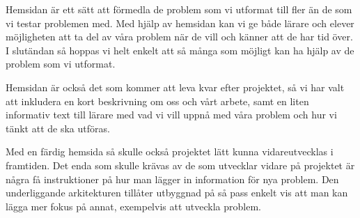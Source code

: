 \textcolor{Mahogany}{Hemsidan är ett sätt att förmedla de problem som vi utformat till fler än de som vi testar problemen med. Med hjälp av hemsidan kan vi ge både lärare och elever möjligheten att ta del av våra problem när de vill och känner att de har tid över.
I slutändan så hoppas vi helt enkelt att så många som möjligt kan ha hjälp av de problem som vi utformat.}

\textcolor{Mahogany}{Hemsidan är också det som kommer att leva kvar efter projektet, så vi har valt att inkludera en kort beskrivning om oss och vårt arbete, samt en liten informativ text till lärare med vad vi vill uppnå med våra problem och hur vi tänkt att de ska utföras.}

\textcolor{WildStrawberry}{
    Med en färdig hemsida så skulle också projektet lätt kunna vidareutvecklas i framtiden. Det enda som skulle krävas av de som utvecklar vidare på projektet är några få instruktioner på hur man lägger in information för nya problem. Den underliggande arkitekturen tillåter utbyggnad på så pass enkelt vis att man kan lägga mer fokus på annat, exempelvis att utveckla problem.
    }
